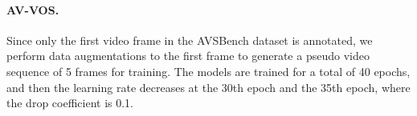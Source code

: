 \documentclass{article}
\begin{document}
\paragraph{AV-VOS.} Since only the first video frame in the AVSBench dataset is annotated, we perform data augmentations to the first frame to generate a pseudo video sequence of 5 frames for training. The models are trained for a total of 40 epochs, and then the learning rate decreases at the 30th epoch and the 35th epoch, where the drop coefficient is 0.1.
\end{document}
